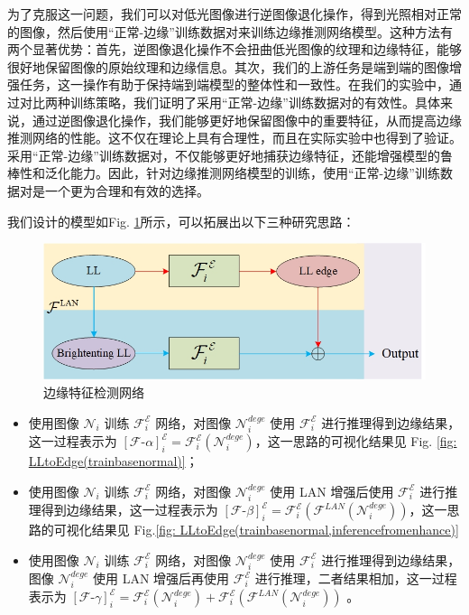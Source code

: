 \documentclass[a4paper]{ctexart}
\begin{document}
		为了克服这一问题，我们可以对低光图像进行逆图像退化操作，得到光照相对正常的图像，然后使用“正常-边缘”训练数据对来训练边缘推测网络模型。这种方法有两个显著优势：首先，逆图像退化操作不会扭曲低光图像的纹理和边缘特征，能够很好地保留图像的原始纹理和边缘信息。其次，我们的上游任务是端到端的图像增强任务，这一操作有助于保持端到端模型的整体性和一致性。在我们的实验中，通过对比两种训练策略，我们证明了采用“正常-边缘”训练数据对的有效性。具体来说，通过逆图像退化操作，我们能够更好地保留图像中的重要特征，从而提高边缘推测网络的性能。这不仅在理论上具有合理性，而且在实际实验中也得到了验证。采用“正常-边缘”训练数据对，不仅能够更好地捕获边缘特征，还能增强模型的鲁棒性和泛化能力。因此，针对边缘推测网络模型的训练，使用“正常-边缘”训练数据对是一个更为合理和有效的选择。
		
		我们设计的模型如Fig. \ref{fig: DCMP}所示，可以拓展出以下三种研究思路：
		
		\begin{figure}[htbp]
			\centering
			\includegraphics[width=0.8\linewidth]{picture/Edge Detection/DCMP}
			\caption{边缘特征检测网络}
			\label{fig: DCMP}
		\end{figure}
		
		\begin{itemize}
			\item[1)]
			使用图像 $\mathcal{N}_{i}$ 训练 $\mathcal{F}_{i}^{\mathcal{E}}$ 网络，对图像 $\mathcal{N}_{i}^{dege}$ 使用 $\mathcal{F}_{i}^{\mathcal{E}}$ 进行推理得到边缘结果，这一过程表示为 ${\left[\mathcal{F}\text{-}\alpha\right]}^{\mathcal{E}}_i = {\mathcal{F}}^\mathcal{E}_{i} (\mathcal{N}_{i}^{dege})$，这一思路的可视化结果见 Fig. \ref{fig: LLtoEdge(trainbasenormal)}；
			
			\item[2)]
			使用图像 $\mathcal{N}_{i}$ 训练 $\mathcal{F}_{i}^{\mathcal{E}}$ 网络，对图像 $\mathcal{N}_{i}^{dege}$ 使用 LAN 增强后使用 $\mathcal{F}_{i}^{\mathcal{E}}$ 进行推理得到边缘结果，这一过程表示为 ${\left[\mathcal{F}\text{-}\beta\right]}^{\mathcal{E}}_i =  \mathcal{F}_{i}^{\mathcal{E}} \left(\mathcal{F}^{LAN} (\mathcal{N}_{i}^{dege})\right)$，这一思路的可视化结果见 Fig.\ref{fig: LLtoEdge(trainbasenormal,inferencefromenhance)}
			
			\item[3)]
			使用图像 $\mathcal{N}_{i}$ 训练 $\mathcal{F}_{i}^{\mathcal{E}}$ 网络，对图像 $\mathcal{N}_{i}^{dege}$ 使用 $\mathcal{F}_{i}^{\mathcal{E}}$ 进行推理得到边缘结果，图像 $\mathcal{N}_{i}^{dege}$ 使用 LAN 增强后再使用 $\mathcal{F}_{i}^{\mathcal{E}}$ 进行推理，二者结果相加，这一过程表示为 ${\left[\mathcal{F}\text{-}\gamma\right]}^{\mathcal{E}}_i = \mathcal{F}_{i}^{\mathcal{E}} (\mathcal{N}_{i}^{dege}) + \mathcal{F}_{i}^{\mathcal{E}} \left(\mathcal{F}^{LAN} (\mathcal{N}_{i}^{dege})\right)$ 。
		\end{itemize}
		
\end{document}
